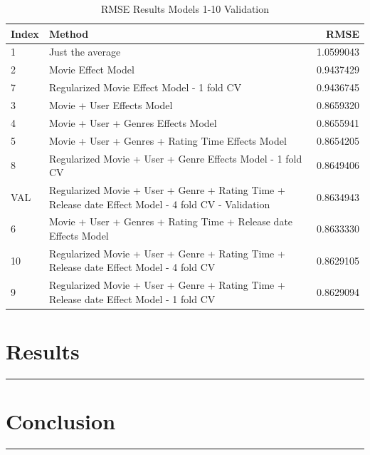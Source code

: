 \documentclass[
]{article}
\begin{document}
\begin{table}[H]

\caption{\label{tab:final_val_3}RMSE Results Models 1-10 Validation\label{tbl:rmse_results_model_1-10_val}}
\centering
\fontsize{7}{9}\selectfont
\begin{tabular}[t]{llr}
\toprule
Index & Method & RMSE\\
\midrule
1 & Just the average & 1.0599043\\
2 & Movie Effect Model & 0.9437429\\
7 & Regularized Movie Effect Model - 1 fold CV & 0.9436745\\
3 & Movie + User Effects Model & 0.8659320\\
4 & Movie + User + Genres Effects Model & 0.8655941\\
5 & Movie + User + Genres + Rating Time Effects Model & 0.8654205\\
8 & Regularized Movie + User + Genre Effects Model - 1 fold CV & 0.8649406\\
VAL & Regularized Movie + User + Genre + Rating Time + Release date Effect Model - 4 fold CV - Validation & 0.8634943\\
6 & Movie + User + Genres + Rating Time + Release date Effects Model & 0.8633330\\
10 & Regularized Movie + User + Genre + Rating Time + Release date Effect Model - 4 fold CV & 0.8629105\\
9 & Regularized Movie + User + Genre + Rating Time + Release date Effect Model - 1 fold CV & 0.8629094\\
\bottomrule
\end{tabular}
\end{table}

\newpage

\hypertarget{results}{%
\section{Results}\label{results}}

\begin{center}\rule{0.5\linewidth}{0.5pt}\end{center}

\newpage

\hypertarget{conclusion}{%
\section{Conclusion}\label{conclusion}}

\begin{center}\rule{0.5\linewidth}{0.5pt}\end{center}
\end{document}
